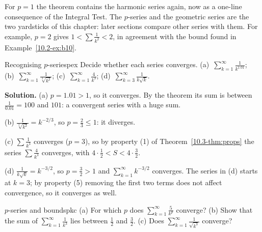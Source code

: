 \documentclass[11pt]{article}
\begin{document}
For $p=1$ the theorem contains the harmonic series again, now as a one-line consequence of the Integral Test. The $p$-series and the geometric series are the two yardsticks of this chapter: later sections compare other series with them. For example, $p=2$ gives $1<\sum\frac1{k^2}<2$, in agreement with the bound found in Example~\ref{10.2-ex:b10}.

\begin{exmp}{Recognising $p$-series}{pex}
Decide whether each series converges. (a)~$\displaystyle\sum_{k=1}^\infty\frac1{k^{1.01}}$; \quad (b)~$\displaystyle\sum_{k=1}^\infty\frac1{\sqrt[3]{k^2}}$; \quad (c)~$\displaystyle\sum_{k=1}^\infty\frac4{k^3}$; \quad (d)~$\displaystyle\sum_{k=3}^\infty\frac1{k\sqrt k}$.

\textbf{Solution.} (a) $p=1.01>1$, so it converges. By the theorem its sum is between $\frac1{0.01}=100$ and $101$: a convergent series with a huge sum.

(b) $\frac1{\sqrt[3]{k^2}}=k^{-2/3}$, so $p=\frac23\le1$: it diverges.

(c) $\sum\frac1{k^3}$ converges ($p=3$), so by property (1) of Theorem~\ref{10.3-thm:props} the series $\sum\frac4{k^3}$ converges, with $4\cdot\frac12<S<4\cdot\frac32$.

(d) $\frac1{k\sqrt k}=k^{-3/2}$, so $p=\frac32>1$ and $\sum_{k=1}^\infty k^{-3/2}$ converges. The series in (d) starts at $k=3$; by property (5) removing the first two terms does not affect convergence, so it converges as well.
\end{exmp}

\begin{kc}{$p$-series and bounds}{pkc}
(a) For which $p$ does $\displaystyle\sum_{k=1}^\infty\frac5{k^{p}}$ converge? (b) Show that the sum of $\displaystyle\sum_{k=1}^\infty\frac1{k^3}$ lies between $\frac12$ and $\frac32$. (c) Does $\displaystyle\sum_{k=1}^\infty\frac1{\sqrt{k^3}}$ converge?
\end{kc}

\end{document}
